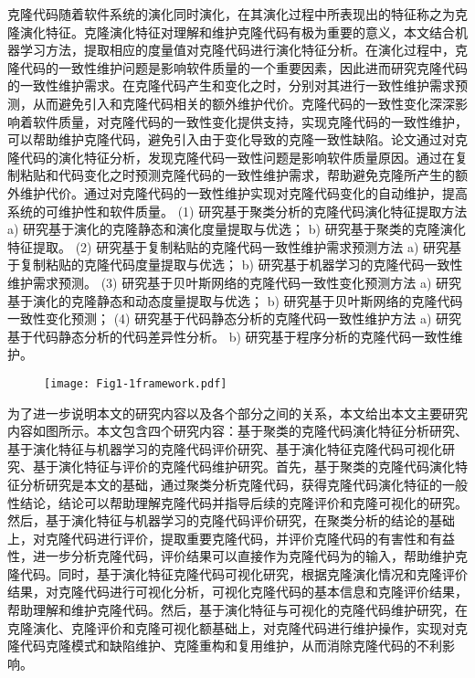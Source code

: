 克隆代码随着软件系统的演化同时演化，在其演化过程中所表现出的特征称之为克隆演化特征。克隆演化特征对理解和维护克隆代码有极为重要的意义，本文结合机器学习方法，提取相应的度量值对克隆代码进行演化特征分析。在演化过程中，克隆代码的一致性维护问题是影响软件质量的一个重要因素，因此进而研究克隆代码的一致性维护需求。在克隆代码产生和变化之时，分别对其进行一致性维护需求预测，从而避免引入和克隆代码相关的额外维护代价。克隆代码的一致性变化深深影响着软件质量，对克隆代码的一致性变化提供支持，实现克隆代码的一致性维护，可以帮助维护克隆代码，避免引入由于变化导致的克隆一致性缺陷。论文通过对克隆代码的演化特征分析，发现克隆代码一致性问题是影响软件质量原因。通过在复制粘贴和代码变化之时预测克隆代码的一致性维护需求，帮助避免克隆所产生的额外维护代价。通过对克隆代码的一致性维护实现对克隆代码变化的自动维护，提高系统的可维护性和软件质量。
(1) 研究基于聚类分析的克隆代码演化特征提取方法
a) 研究基于演化的克隆静态和演化度量提取与优选；
b) 研究基于聚类的克隆演化特征提取。
(2) 研究基于复制粘贴的克隆代码一致性维护需求预测方法
a) 研究基于复制粘贴的克隆代码度量提取与优选；
b) 研究基于机器学习的克隆代码一致性维护需求预测。
(3) 研究基于贝叶斯网络的克隆代码一致性变化预测方法
a) 研究基于演化的克隆静态和动态度量提取与优选；
b) 研究基于贝叶斯网络的克隆代码一致性变化预测；
(4) 研究基于代码静态分析的克隆代码一致性维护方法
a) 研究基于代码静态分析的代码差异性分析。
b) 研究基于程序分析的克隆代码一致性维护。

\begin{figure}[htbp]
\centering
\texttt{[image: Fig1-1framework.pdf]}
\vspace{-1em}
\end{figure}


为了进一步说明本文的研究内容以及各个部分之间的关系，本文给出本文主要研究内容如图所示。本文包含四个研究内容：基于聚类的克隆代码演化特征分析研究、基于演化特征与机器学习的克隆代码评价研究、基于演化特征克隆代码可视化研究、基于演化特征与评价的克隆代码维护研究。首先，基于聚类的克隆代码演化特征分析研究是本文的基础，通过聚类分析克隆代码，获得克隆代码演化特征的一般性结论，结论可以帮助理解克隆代码并指导后续的克隆评价和克隆可视化的研究。然后，基于演化特征与机器学习的克隆代码评价研究，在聚类分析的结论的基础上，对克隆代码进行评价，提取重要克隆代码，并评价克隆代码的有害性和有益性，进一步分析克隆代码，评价结果可以直接作为克隆代码为的输入，帮助维护克隆代码。同时，基于演化特征克隆代码可视化研究，根据克隆演化情况和克隆评价结果，对克隆代码进行可视化分析，可视化克隆代码的基本信息和克隆评价结果，帮助理解和维护克隆代码。然后，基于演化特征与可视化的克隆代码维护研究，在克隆演化、克隆评价和克隆可视化额基础上，对克隆代码进行维护操作，实现对克隆代码克隆模式和缺陷维护、克隆重构和复用维护，从而消除克隆代码的不利影响。

